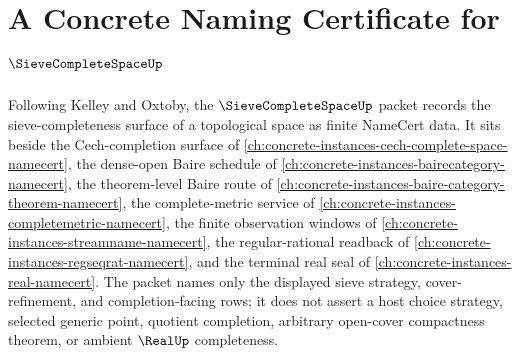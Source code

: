 \chapter{A Concrete Naming Certificate for $\SieveCompleteSpaceUp$}
\label{ch:concrete-instances-sieve-complete-space-namecert}

Following Kelley and Oxtoby, the $\SieveCompleteSpaceUp$ packet records the sieve-completeness surface of a topological space as finite NameCert data. It sits beside the Cech-completion surface of \autoref{ch:concrete-instances-cech-complete-space-namecert}, the dense-open Baire schedule of \autoref{ch:concrete-instances-bairecategory-namecert}, the theorem-level Baire route of \autoref{ch:concrete-instances-baire-category-theorem-namecert}, the complete-metric service of \autoref{ch:concrete-instances-completemetric-namecert}, the finite observation windows of \autoref{ch:concrete-instances-streamname-namecert}, the regular-rational readback of \autoref{ch:concrete-instances-regseqrat-namecert}, and the terminal real seal of \autoref{ch:concrete-instances-real-namecert}. The packet names only the displayed sieve strategy, cover-refinement, and completion-facing rows; it does not assert a host choice strategy, selected generic point, quotient completion, arbitrary open-cover compactness theorem, or ambient $\RealUp$ completeness.

